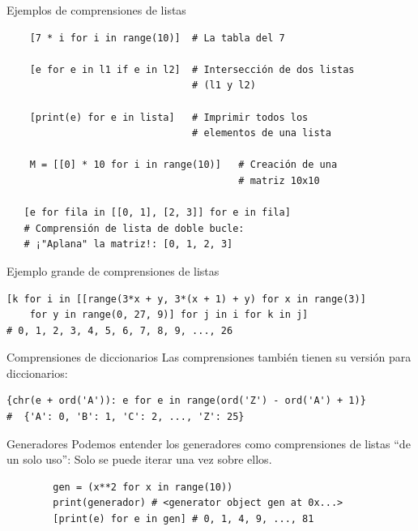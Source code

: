 \documentclass[10pt]{beamer} %
\begin{document}
\begin{frame}[fragile]{Ejemplos de comprensiones de listas}
    \begin{verbatim}
    [7 * i for i in range(10)]  # La tabla del 7
    
    [e for e in l1 if e in l2]  # Intersección de dos listas
                                # (l1 y l2)
                                
    [print(e) for e in lista]   # Imprimir todos los
                                # elementos de una lista
                                
    M = [[0] * 10 for i in range(10)]   # Creación de una
                                        # matriz 10x10
                                    
   [e for fila in [[0, 1], [2, 3]] for e in fila]
   # Comprensión de lista de doble bucle:
   # ¡"Aplana" la matriz!: [0, 1, 2, 3]
    \end{verbatim}
\end{frame}

\begin{frame}[fragile]{Ejemplo grande de comprensiones de listas}
    \begin{verbatim}
[k for i in [[range(3*x + y, 3*(x + 1) + y) for x in range(3)]
    for y in range(0, 27, 9)] for j in i for k in j]
# 0, 1, 2, 3, 4, 5, 6, 7, 8, 9, ..., 26
    \end{verbatim}
\end{frame}

\begin{frame}[fragile]{Comprensiones de diccionarios}
    Las comprensiones también tienen su versión para diccionarios:
    \begin{verbatim}
{chr(e + ord('A')): e for e in range(ord('Z') - ord('A') + 1)}
#  {'A': 0, 'B': 1, 'C': 2, ..., 'Z': 25}
    \end{verbatim}
\end{frame}

\begin{frame}[fragile]{Generadores}
    Podemos entender los generadores como comprensiones de listas ``de un solo uso'': Solo se puede iterar una vez sobre ellos.
    \begin{verbatim}
        gen = (x**2 for x in range(10))
        print(generador) # <generator object gen at 0x...>
        [print(e) for e in gen] # 0, 1, 4, 9, ..., 81
    \end{verbatim}
\end{frame}
\end{document}
